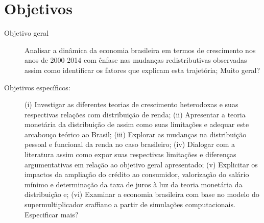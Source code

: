 \section{Objetivos}\label{OBJ}

\begin{description}
	\item[Objetivo geral] Analisar a dinâmica da economia brasileira em termos de crescimento nos anos de 2000-2014 com ênfase nas mudanças redistributivas observadas assim como identificar os fatores que explicam esta trajetória; {\color{blue} Muito geral?}
	\item[Objetivos específicos:] (i) Investigar as diferentes teorias de crescimento heterodoxas e suas respectivas relações com distribuição de renda; (ii) Apresentar a teoria monetária da distribuição de \textcite{pivetti_essay_1992} assim como suas limitações e adequar este arcabouço teórico ao Brasil; (iii) Explorar as mudanças na distribuição pessoal e funcional da renda no caso brasileiro; (iv) Dialogar com a literatura assim como expor suas respectivas limitações e  diferenças argumentativas em relação ao objetivo geral apresentado; (v) Explicitar os impactos da ampliação do crédito ao consumidor, valorização do salário mínimo e determinação da taxa de juros à luz da teoria monetária da distribuição e; (vi) Examinar a economia brasileira com base no modelo do supermultiplicador sraffiano a partir de simulações computacionais. {\color{blue} Especificar mais?}
\end{description}



